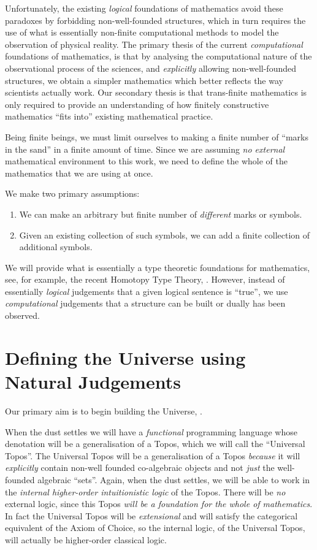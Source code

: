 \documentclass[a4paper,openany]{amsart}
\begin{document}
Unfortunately, the existing \emph{logical} foundations of mathematics avoid
these paradoxes by forbidding non-well-founded structures, which in turn
requires the use of what is essentially non-finite computational methods to
model the observation of physical reality. The primary thesis of the current
\emph{computational} foundations of mathematics, is that by analysing the
computational nature of the observational process of the sciences, and
\emph{explicitly} allowing non-well-founded structures, we obtain a simpler
mathematics which better reflects the way scientists actually work. Our
secondary thesis is that trans-finite mathematics is only required to provide an
understanding of how finitely constructive mathematics ``fits into'' existing
mathematical practice.

Being finite beings, we must limit ourselves to making a finite number of
``marks in the sand'' in a finite amount of time. Since we are assuming \emph{no
external} mathematical environment to this work, we need to define the whole of
the mathematics that we are using at once.

We make two primary assumptions:
\begin{enumerate}
\item We can make an arbitrary but finite number of \emph{different} marks or
symbols.
\item Given an existing collection of such symbols, we can add a finite
collection of additional symbols.
\end{enumerate}

We will provide what is essentially a type theoretic foundations for
mathematics, see, for example, the recent Homotopy Type Theory,
\cite{awodeyCoquandVoevodsky2013homotopyTypeTheory}. However, instead of
essentially \emph{logical} judgements that a given logical sentence is ``true'',
we use \emph{computational} judgements that a structure can be built or dually
has been observed.

\section{Defining the Universe using Natural Judgements}

Our primary aim is to begin building the Universe, \Universe{}{}.

When the dust settles we will have a \emph{functional} programming language
whose denotation will be a generalisation of a Topos, which we will call the
``Universal Topos''. The Universal Topos will be a generalisation of a Topos
\emph{because} it will \emph{explicitly} contain non-well founded co-algebraic
objects and not \emph{just} the well-founded algebraic ``sets''. Again, when the
dust settles, we will be able to work in the \emph{internal higher-order
intuitionistic logic} of the Topos. There will be \emph{no} external logic,
since this Topos \emph{will be a foundation for the \emph{whole} of
mathematics}. In fact the Universal Topos will be \emph{extensional} and will
satisfy the categorical equivalent of the Axiom of Choice, so the internal
logic, of the Universal Topos, will actually be higher-order classical logic.
\end{document}
